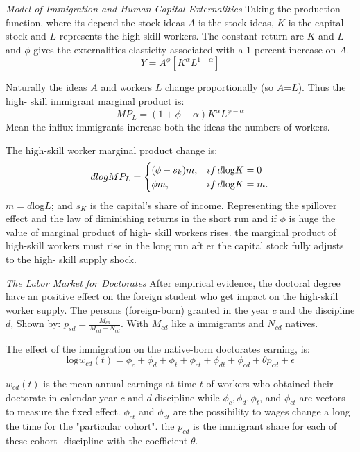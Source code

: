 \documentclass[11pt]{article}
\theoremstyle{prop}
\begin{document}
	\textit{Model of Immigration and Human Capital Externalities}
	Taking the production function, where its depend the stock ideas 
	$A$ is the stock ideas, $K$ is the capital stock and $L$ represents the high-skill workers. The constant return are $K$ and $L$ and $\phi$ gives the externalities elasticity associated with a 1 percent increase on $A$.
	\begin{equation}
		Y= A^\phi[K^\alpha L^{1-\alpha}] 		
	\end{equation}
	
	\noindent Naturally the ideas $A$ and workers $L$ change proportionally (so $A$=$L$). Thus the high- skill immigrant marginal product is:
	\begin{equation}
		MP_L= (1+ \phi -\alpha)K^\alpha L^{\phi-\alpha}		
	\end{equation}
	Mean the influx immigrants increase both the ideas the numbers of workers. 
	
	The high-skill worker marginal product change is:
	\begin{equation}
		dlog MP_L= \begin{cases}
			(\phi-s_k)m,
			& if\thinspace d\text{log}K=0\\
			\phi m, 	& if\thinspace d\text{log}K=m.
		\end{cases}
	\end{equation}
	$m = d$log$L$; and $s_K$ is the capital’s share of income.
	Representing the spillover effect and the law of diminishing returns in the short run and if $\phi$ is huge the value of marginal product of high- skill workers rises. the marginal product of high-skill workers must rise in the long run aft er the capital stock fully adjusts to the high- skill supply shock.
	
	\textit{The Labor Market for Doctorates}
	After empirical evidence, the doctoral degree have an positive effect on the foreign student who get impact on the high-skill worker supply. The persons (foreign-born) granted in the year $c$ and the discipline $d$, Shown by: $p_{sd}= \frac{M_{cd}}{M_{cd} + N_{cd}}$. With $M_{cd}$ like a immigrants and $N_{cd}$ natives. 
	
	The effect of the immigration on the native-born doctorates earning, is: 
	\begin{equation}
		\text{log} w_{cd} (t)=\phi_c+\phi_d+\phi_t+\phi_{ct}+\phi_{dt}+\phi_{cd}+ \theta p_{cd} + \epsilon 		
	\end{equation}
	
	$w_{cd} (t)$ is the mean annual earnings at time $t$  of workers who 
	obtained their doctorate in calendar year $c$ and $d$ discipline  while $\phi_c, \phi_d, \phi_t$, and $\phi_{ct}$ are vectors to measure the fixed effect.
	$\phi_{ct}$ and $\phi_{dt}$ are the possibility to wages change a long the time for the "particular cohort". the $p_{cd}$ is the immigrant share for each of these cohort- discipline with the coefficient $\theta$.
	
\end{document}
